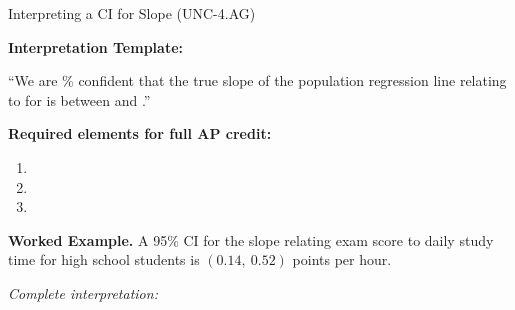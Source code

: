 \documentclass[10pt]{article}
\begin{document}
\begin{notesbox}{Interpreting a CI for Slope (UNC-4.AG)}

\textbf{Interpretation Template:}

``We are \blank{2cm}\% confident that the true slope of the population regression line
relating \blank{4cm} to \blank{4cm} for \blank{4cm} is between \blank{2cm} and
\blank{2cm} \blank{3cm}.''

\vspace{0.1in}
\textbf{Required elements for full AP credit:}
\begin{enumerate}
    \item {}
    \item {}
    \item {}
\end{enumerate}

\vspace{0.1in}
\textbf{Worked Example.} A 95\% CI for the slope relating exam score to daily study time
for high school students is $(0.14,\ 0.52)$ points per hour.

\textit{Complete interpretation:}

\end{notesbox}
\end{document}
